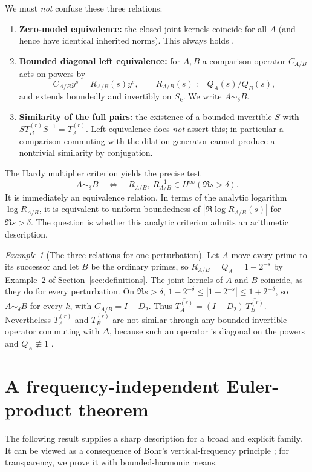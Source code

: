 \documentclass[12pt,letterpaper]{article}
\numberwithin{equation}{section}
\theoremstyle{remark}
\newtheorem{example}[theorem]{Example}
\begin{document}
We must \emph{not} confuse these three relations:
\begin{enumerate}[leftmargin=2em]
\item \textbf{Zero-model equivalence:} the closed joint kernels coincide for all $A$ (and hence have identical inherited norms). This always holds \cite[Theorem~2.1]{GS26}.
\item \textbf{Bounded diagonal left equivalence:} for $A,B$ a comparison operator $C_{A/B}$ acts on powers by
\[
 C_{A/B}y^s=R_{A/B}(s)y^s,\qquad R_{A/B}(s):=Q_A(s)/Q_B(s),
\]
 and extends boundedly and invertibly on $S_k$. We write $A\sim_\delta B$.
\item \textbf{Similarity of the full pairs:} the existence of a bounded invertible $S$ with $ST_B^{(r)}S^{-1}=T_A^{(r)}$. Left equivalence does \emph{not} assert this; in particular a comparison commuting with the dilation generator cannot produce a nontrivial similarity by conjugation.
\end{enumerate}
The Hardy multiplier criterion \cite[Proposition~6.1]{GS26} yields the precise test
\begin{equation}\label{eq:Hinf}
 \boxed{A\sim_\delta B\quad\Longleftrightarrow\quad
 R_{A/B},\ R_{A/B}^{-1}\in H^\infty(\Re s>\delta).}
\end{equation}
It is immediately an equivalence relation. In terms of the analytic logarithm $\log R_{A/B}$, it is equivalent to uniform boundedness of $|\Re\log R_{A/B}(s)|$ for $\Re s>\delta$. The question is whether this analytic criterion admits an arithmetic description.

\begin{example}[The three relations for one perturbation]\label{ex:three}
Let $A$ move every prime to its successor and let $B$ be the ordinary
primes, so $R_{A/B}=Q_A=1-2^{-s}$ by Example~2 of
Section~\ref{sec:definitions}.  The joint kernels of $A$ and $B$
coincide, as they do for every perturbation.  On $\Re s>\delta$,
$1-2^{-\delta}\le|1-2^{-s}|\le1+2^{-\delta}$, so $A\sim_\delta B$ for
every $k$, with $C_{A/B}=I-D_2$.  Thus
$\overline{T_A^{(r)}}=(I-D_2)\,\overline{T_B^{(r)}}$.  Nevertheless
$T_A^{(r)}$ and $T_B^{(r)}$ are not similar through any bounded
invertible operator commuting with $\Delta$, because such an operator
is diagonal on the powers and $Q_A\not\equiv1$
\cite[Proposition~8.1]{GS26}.
\end{example}

\section{A frequency-independent Euler-product theorem}
The following result supplies a sharp description for a broad and explicit family. It can be viewed as a consequence of Bohr's vertical-frequency principle \cite{DGMS19,Sc20}; for transparency, we prove it with bounded-harmonic means.
\end{document}
